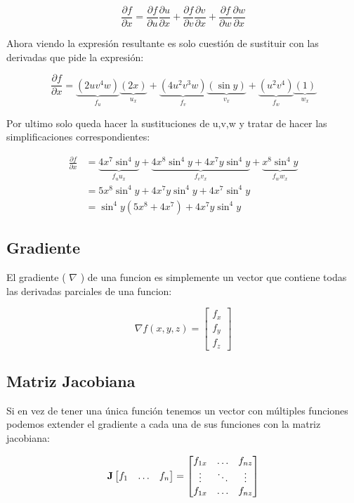 \documentclass{article}
\begin{document}
\[
\frac{\partial f}{\partial x} = 
  \frac{\partial f}{\partial u}\frac{\partial u}{\partial x} + 
  \frac{\partial f}{\partial v}\frac{\partial v}{\partial x} + 
  \frac{\partial f}{\partial w}\frac{\partial w}{\partial x}
\]

Ahora viendo la expresión resultante es solo cuestión de sustituir con las derivadas que pide la expresión:

\[
\frac{\partial f}{\partial x} = 
  \underbrace{(2uv^4w)}_{f_u}\underbrace{(2x)}_{u_x} + 
  \underbrace{(4u^2v^3w)}_{f_v}\underbrace{(\sin y)}_{v_x} + 
  \underbrace{(u^2v^4)}_{f_w}\underbrace{(1)}_{w_x}
\]

Por ultimo solo queda hacer la sustituciones de u,v,w y tratar de hacer las simplificaciones correspondientes:

\[ \begin{aligned}
\frac{\partial f}{\partial x} &= 
  \underbrace{ 4x^7 \sin^4 y }_{f_u u_x} + 
  \underbrace{ 4x^8\sin^4y + 4x^7y\sin^4y }_{f_v v_x} + 
  \underbrace{ x^8\sin^4 y }_{f_w w_x} \\
&=
  5x^8\sin^4 y + 4x^7 y \sin^4 y + 4x^7 \sin^4 y \\
&= 
\boxed{ \sin^4y(5x^8+4x^7) + 4x^7 y \sin^4 y }
\end{aligned} \]

\subsection{Gradiente}
\label{sec:org09d009e}
El gradiente ( \(\nabla\) ) de una funcion es simplemente un vector que contiene todas las derivadas parciales de una funcion:

\[ \nabla f(x,y,z) = \begin{bmatrix}
f_x \\
f_y \\
f_z
\end{bmatrix} \]

\subsection{Matriz Jacobiana}
\label{sec:org7b5c879}
Si en vez de tener una única función tenemos un vector con múltiples funciones podemos extender el gradiente a cada una de sus funciones con la matriz jacobiana:

\[ \bold{J}\begin{bmatrix}
  f_1 & \ldots & f_n \\
\end{bmatrix} = \begin{bmatrix}
  f_{1x} & \ldots & f_{nz} \\
  \vdots & \ddots & \vdots \\
  f_{1x} & \ldots & f_{nz} \\
\end{bmatrix}  \]
\end{document}
